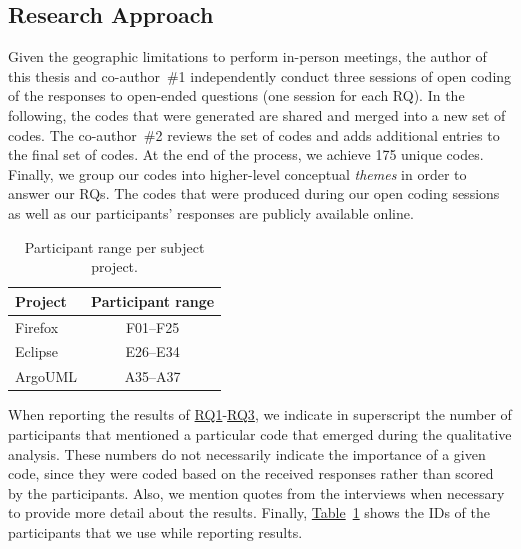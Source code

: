\subsection{Research Approach}

Given the geographic limitations to perform in-person meetings, the author of
this thesis and co-author~\#1 independently conduct three sessions of open
coding of the responses to open-ended questions (one session for each RQ). In
the following, the codes that were generated are shared and merged into a new
set of codes. The co-author~\#2 reviews the set of codes and adds additional
entries to the final set of codes. At the end of the process, we achieve 175
unique codes. Finally, we group our codes into higher-level conceptual {\em
themes} in order to answer our RQs. The codes that were produced during our open
coding sessions as well as our participants' responses are publicly available
online.

\begin{table}
	\footnotesize
	\centering
	\caption{Participant range per subject project.
		\label{tbl:participants}
	}
	\begin{tabular}{lc}
		\hline 
		\textbf{Project} & \textbf{Participant range}\tabularnewline
		\hline 
		\hline 
		Firefox & F01--F25\tabularnewline
		\hline 
		Eclipse & E26--E34\tabularnewline
		\hline 
		ArgoUML & A35--A37\tabularnewline
		\hline 
	\end{tabular}
\end{table}

When reporting the results of \hyperref[ch5:rq1]{RQ1}-\hyperref[ch5:rq3]{RQ3},
we indicate in superscript the number of participants that mentioned a
particular code that emerged during the qualitative analysis. These numbers do
not necessarily indicate the importance of a given code, since they were coded
based on the received responses rather than scored by the participants. Also, we
mention quotes from the interviews when necessary to provide more detail about
the results. Finally, \hyperref[tbl:participants]{Table}~\ref{tbl:participants}
shows the IDs of the participants that we use while reporting results.

